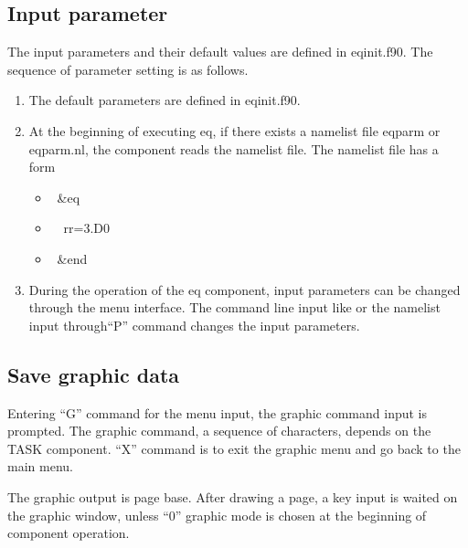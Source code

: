 \documentclass[11pt]{article}
\begin{document}
\subsection{Input parameter}

The input parameters and their default values are defined in
eqinit.f90.  The sequence of parameter setting is as follows.

\begin{enumerate}
\item
The default parameters are defined in eqinit.f90.
\item
At the beginning of executing eq, if there exists a namelist file
eqparm or eqparm.nl, the component reads the namelist file. The
namelist file has a form
\begin{itemize}
\item[] \ \&eq
\item[] \ \ rr=3.D0
\item[] \ \&end
\end{itemize}
\item
During the operation of the eq component, input parameters can be
changed through the menu interface.  The command line input like
 or the namelist input through``P'' command changes the
input parameters.
\end{enumerate}

\subsection{Save graphic data}

Entering ``G'' command for the menu input, the graphic command input
is prompted.  The graphic command, a sequence of characters, depends
on the TASK component.  ``X'' command is to exit the graphic menu and
go back to the main menu. 

The graphic output is page base.  After drawing a page, a key input is
waited on the graphic window, unless ``0'' graphic mode is chosen at
the beginning of component operation. 
\end{document}
